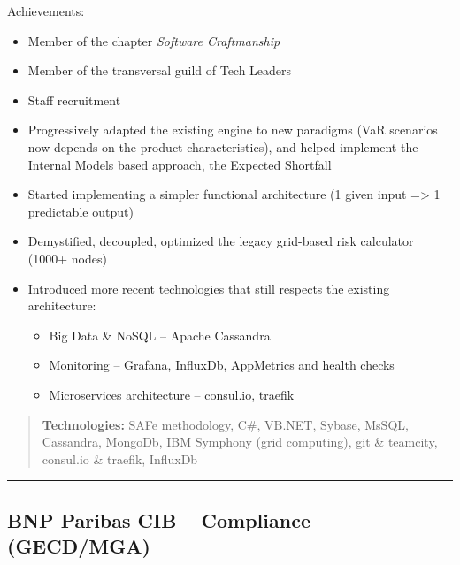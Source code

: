 \documentclass[
]{article}
\providecommand{\tightlist}{%
  \setlength{\itemsep}{0pt}\setlength{\parskip}{0pt}}
\begin{document}
Achievements:

\begin{itemize}
\tightlist
\item
  Member of the chapter \emph{Software Craftmanship}
\item
  Member of the transversal guild of Tech Leaders
\item
  Staff recruitment
\item
  Progressively adapted the existing engine to new paradigms (VaR
  scenarios now depends on the product characteristics), and helped
  implement the Internal Models based approach, the Expected Shortfall
\item
  Started implementing a simpler functional architecture (1 given input
  =\textgreater{} 1 predictable output)
\item
  Demystified, decoupled, optimized the legacy grid-based risk
  calculator (1000+ nodes)
\item
  Introduced more recent technologies that still respects the existing
  architecture:

  \begin{itemize}
  \tightlist
  \item
    Big Data \& NoSQL -- Apache Cassandra
  \item
    Monitoring -- Grafana, InfluxDb, AppMetrics and health checks
  \item
    Microservices architecture -- consul.io, traefik
  \end{itemize}
\end{itemize}

\begin{quote}
\textbf{Technologies:} SAFe methodology, C\#, VB.NET, Sybase, MsSQL,
Cassandra, MongoDb, IBM Symphony (grid computing), git \& teamcity,
consul.io \& traefik, InfluxDb
\end{quote}

\begin{center}\rule{0.5\linewidth}{\linethickness}\end{center}

\hypertarget{bnp-paribas-cib-compliance-gecdmga-052014---052016-2yr}{%
\subsection{\texorpdfstring{BNP Paribas CIB -- Compliance (GECD/MGA)
\hfill{}}{BNP Paribas CIB -- Compliance (GECD/MGA) 05/2014 - 05/2016 (2yr)}}\label{bnp-paribas-cib-compliance-gecdmga-052014---052016-2yr}}
\end{document}

